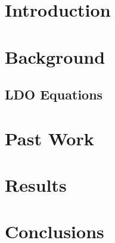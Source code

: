 \documentclass{article} %
\begin{document}
\pagebreak

\begin{abstract}
{
abstract

Keywords: x; y; z
}
\end{abstract}

\pagebreak


\section{Introduction}
\label{sec:intro}

\section{Background}
\label{sec:background}

\subsection{LDO Equations}

\section{Past Work}
\label{sec:pastwork}

\section{Results}
\label{sec:results}

\section{Conclusions}
\label{sec:conclusions}
\end{document}
